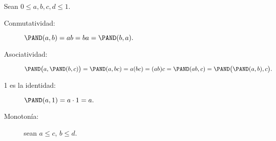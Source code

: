 
Sean \(0 ≤ a, b, c, d ≤ 1\).
\begin{description}
  \item[Conmutatividad:]
    \(
      \PAND(a, b) =
      ab =
      ba =
      \PAND(b, a).
    \)
  \item[Asociatividad:]
    \(
      \PAND\bigl(a, \PAND(b, c)\bigr) =
      \PAND(a, bc) =
      a(bc) =
      (ab)c =
      \PAND(ab, c) =
      \PAND\bigl(\PAND(a, b), c\bigr).
    \)
  \item[1 es la identidad:]
    \(
      \PAND(a, 1) = a\cdot 1 = a.
    \)
  \item[Monotonía:] sean \(a ≤ c\), \(b ≤ d\).

\end{description}

\saltito


